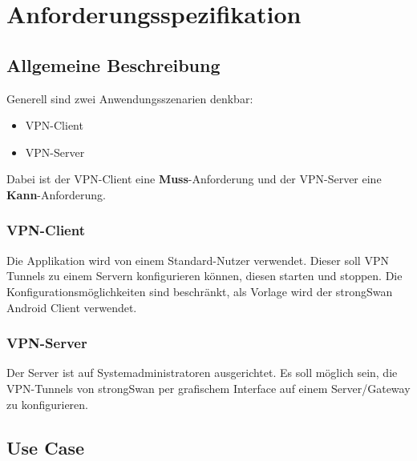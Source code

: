 \section{Anforderungsspezifikation}
\subsection{Allgemeine Beschreibung}
Generell sind zwei Anwendungsszenarien denkbar:
\begin{itemize}
	\item VPN-Client
	\item VPN-Server
\end{itemize}
\medskip
Dabei ist der VPN-Client eine \textbf{Muss}-Anforderung und der VPN-Server eine \textbf{Kann}-Anforderung.
\medskip
\subsubsection{VPN-Client}
Die Applikation wird von einem Standard-Nutzer verwendet. Dieser soll VPN Tunnels zu einem Servern konfigurieren können, diesen starten und stoppen. Die Konfigurationsmöglichkeiten sind beschränkt, als Vorlage wird der strongSwan Android Client verwendet.\\


\subsubsection{VPN-Server}
Der Server ist auf Systemadministratoren ausgerichtet. Es soll möglich sein, die VPN-Tunnels von strongSwan per grafischem Interface auf einem Server/Gateway zu konfigurieren.

\subsection{Use Case}


